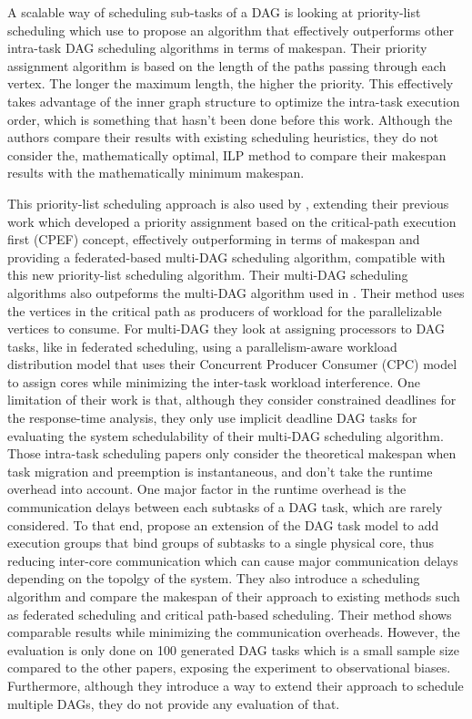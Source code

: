 A scalable way of scheduling sub-tasks of a DAG 
is looking at priority-list scheduling
which \citet{He2019DagIntra} use to propose 
an algorithm that effectively outperforms
other intra-task DAG scheduling algorithms
in terms of makespan.
Their priority assignment algorithm
is based on the length of the paths passing through each vertex.
The longer the maximum length, the higher the priority.
This effectively takes advantage of the inner graph structure
to optimize the intra-task execution order,
which is something that hasn't been done before this work.
Although the authors compare their results with existing
scheduling heuristics, they do not consider 
the, mathematically optimal, ILP method to compare
their makespan results with the mathematically minimum makespan.

This priority-list scheduling approach is also 
used by \citet{Zhao2022DAGsched}, extending their previous work\cite{zhao2020DAGsched}
which developed a priority assignment based on 
the critical-path execution first (CPEF) concept,
effectively outperforming \citet{He2019DagIntra}
in terms of makespan and providing 
a federated-based multi-DAG scheduling algorithm,
compatible with this new priority-list scheduling algorithm.
Their multi-DAG scheduling algorithms also outpeforms 
the multi-DAG algorithm used in \cite{He2019DagIntra}.
Their method uses the vertices in the critical path 
as producers of workload for the parallelizable vertices
to consume.
For multi-DAG they look at assigning processors
to DAG tasks, like in federated scheduling, using 
a parallelism-aware workload distribution model
that uses their Concurrent Producer Consumer (CPC) model
to assign cores while minimizing the inter-task workload interference.
One limitation of their work is that,
although they consider constrained deadlines for the response-time
analysis, they only use implicit deadline DAG tasks 
for evaluating the system schedulability of their multi-DAG 
scheduling algorithm.\\


Those intra-task scheduling papers only consider the theoretical
makespan when task migration and preemption 
is instantaneous, and don't take the runtime overhead into account.
One major factor in the runtime overhead is the communication 
delays between each subtasks of a DAG task, which are rarely considered.
To that end, \citet{Shi2024DagExecGroups}
propose an extension of the DAG task model to add 
execution groups that bind groups of subtasks
to a single physical core, thus reducing 
inter-core communication which can cause major
communication delays depending on the topolgy of the system.
They also introduce a scheduling algorithm 
and compare the makespan of their approach to existing methods
such as federated scheduling and critical path-based scheduling.
Their method shows comparable results while minimizing 
the communication overheads.
However, the evaluation is only done on 100 generated 
DAG tasks which is a small sample size compared to the other papers\cite{Zhao2022DAGsched}\cite{He2019DagIntra},
exposing the experiment to observational biases.
Furthermore, although they introduce a way to extend their approach to schedule
multiple DAGs, they do not provide any evaluation of that.


